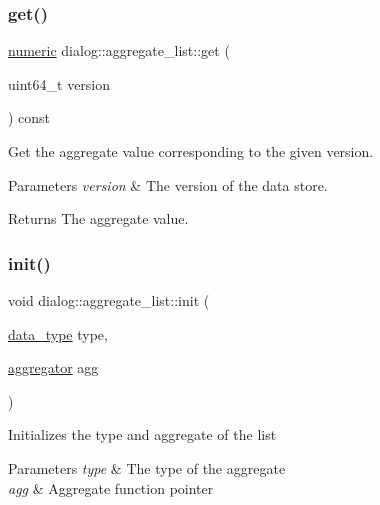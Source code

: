 \subsubsection{\texorpdfstring{get()}{get()}}
{\footnotesize\ttfamily \hyperlink{classdialog_1_1numeric}{numeric} dialog\+::aggregate\+\_\+list\+::get (\begin{DoxyParamCaption}\item[{uint64\+\_\+t}]{version }\end{DoxyParamCaption}) const\hspace{0.3cm}{\ttfamily [inline]}}

Get the aggregate value corresponding to the given version.


\begin{DoxyParams}{Parameters}
{\em version} & The version of the data store. \\
\hline
\end{DoxyParams}
\begin{DoxyReturn}{Returns}
The aggregate value. 
\end{DoxyReturn}
\mbox{\label{classdialog_1_1aggregate__list_ae55dc54fd08454fb30679fe54650cd76}} 
\subsubsection{\texorpdfstring{init()}{init()}\hspace{0.1cm}{\footnotesize\ttfamily [1/2]}}
{\footnotesize\ttfamily void dialog\+::aggregate\+\_\+list\+::init (\begin{DoxyParamCaption}\item[{\hyperlink{structdialog_1_1data__type}{data\+\_\+type}}]{type,  }\item[{\hyperlink{structdialog_1_1aggregator}{aggregator}}]{agg }\end{DoxyParamCaption})\hspace{0.3cm}{\ttfamily [inline]}}

Initializes the type and aggregate of the list 
\begin{DoxyParams}{Parameters}
{\em type} & The type of the aggregate \\
\hline
{\em agg} & Aggregate function pointer \\
\hline
\end{DoxyParams}
\mbox{\label{classdialog_1_1aggregate__list_aa362f04871cc8759088cef403c2fb063}} 
